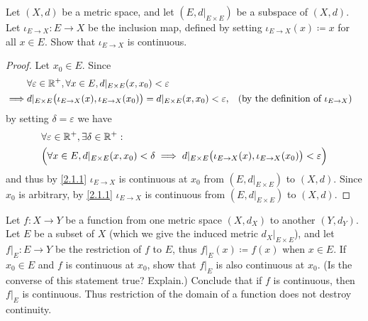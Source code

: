 \begin{ex}\label{ex:2.1.5}
  Let \((X, d)\) be a metric space, and let \((E, d|_{E \times E})\) be a subspace of \((X, d)\).
  Let \(\iota_{E \to X} : E \to X\) be the inclusion map, defined by setting \(\iota_{E \to X}(x) \coloneqq x\) for all \(x \in E\).
  Show that \(\iota_{E \to X}\) is continuous.
\end{ex}

\begin{proof}
  Let \(x_0 \in E\).
  Since
  \begin{align*}
             & \forall \varepsilon \in \mathbb{R}^+, \forall x \in E, d|_{E \times E}(x, x_0) < \varepsilon                                                                              \\
    \implies & d|_{E \times E}\big(\iota_{E \to X}(x), \iota_{E \to X}(x_0)\big) = d|_{E \times E}(x, x_0) < \varepsilon, &  & \text{(by the definition of \(\iota_{E \to X}\))}
  \end{align*}
  by setting \(\delta = \varepsilon\) we have
  \begin{align*}
     & \forall \varepsilon \in \mathbb{R}^+, \exists \delta \in \mathbb{R}^+ :                                                                                              \\
     & \Big(\forall x \in E, d|_{E \times E}(x, x_0) < \delta \implies d|_{E \times E}\big(\iota_{E \to X}(x), \iota_{E \to X}(x_0)\big) < \varepsilon\Big)
  \end{align*}
  and thus by \cref{2.1.1} \(\iota_{E \to X}\) is continuous at \(x_0\) from \((E, d|_{E \times E})\) to \((X, d)\).
  Since \(x_0\) is arbitrary, by \cref{2.1.1} \(\iota_{E \to X}\) is continuous from \((E, d|_{E \times E})\) to \((X, d)\).
\end{proof}

\begin{ex}\label{ex:2.1.6}
  Let \(f : X \to Y\) be a function from one metric space \((X, d_X)\) to another \((Y, d_Y)\).
  Let \(E\) be a subset of \(X\) (which we give the induced metric \(d_X|_{E \times E}\)), and let \(f|_E : E \to Y\) be the restriction of \(f\) to \(E\), thus \(f|_E(x) \coloneqq f(x)\) when \(x \in E\).
  If \(x_0 \in E\) and \(f\) is continuous at \(x_0\), show that \(f|_E\) is also continuous at \(x_0\).
  (Is the converse of this statement true? Explain.)
  Conclude that if \(f\) is continuous, then \(f|_E\) is continuous.
  Thus restriction of the domain of a function does not destroy continuity.
\end{ex}


